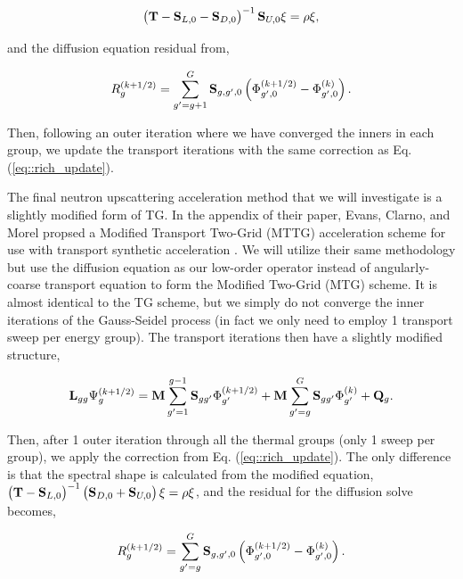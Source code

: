 \documentclass[11pt]{article}
\begin{document}
\begin{equation}
\label{eq::TG_accel_EC}
\left( {\bf T}- {\bf S}_{L,0} - {\bf S}_{D,0} \right)^{-1}  {\bf S}_{U,0}  \xi = \rho \xi,
\end{equation}

\noindent and the diffusion equation residual from,

\begin{equation}
\label{eq::TG_residual}
R_g^{(k+1/2)} =  \sum_{g'=g+1}^G {\bf S}_{g, g',0} \left(  \Phi_{g',0}^{(k+1/2)} - \Phi_{g',0}^{(k)}  \right).
\end{equation}

\noindent Then, following an outer iteration where we have converged the inners in each group, we update the transport iterations with the same correction as Eq. (\ref{eq::rich_update}).

The final neutron upscattering acceleration method that we will investigate is a slightly modified form of TG. In the appendix of their paper, Evans, Clarno, and Morel propsed a Modified Transport Two-Grid (MTTG) acceleration scheme for use with transport synthetic acceleration \cite{evans2010transport}. We will utilize their same methodology but use the diffusion equation as our low-order operator instead of angularly-coarse transport equation to form the Modified Two-Grid (MTG) scheme. It is almost identical to the TG scheme, but we simply do not converge the inner iterations of the Gauss-Seidel process (in fact we only need to employ 1 transport sweep per energy group). The transport iterations then have a slightly modified structure,

\begin{equation}
\label{eq::MTG_it}
{\bf L}_{gg} \Psi_g^{(k+1/2)} = {\bf M} \sum_{g'=1}^{g-1} {\bf S}_{g g'} \Phi_{g'}^{(k+1/2)} + {\bf M} \sum_{g'=g}^G {\bf S}_{g g'} \Phi_{g'}^{(k)} + {\bf Q}_g .
\end{equation}

Then, after 1 outer iteration through all the thermal groups (only 1 sweep per group), we apply the correction from Eq. (\ref{eq::rich_update}). The only difference is that the spectral shape is calculated from the modified equation, $\left( {\bf T}- {\bf S}_{L,0} \right)^{-1} \left( {\bf S}_{D,0}+ {\bf S}_{U,0} \right) \xi = \rho \xi $, and the residual for the diffusion solve becomes,

\begin{equation}
\label{eq::MTG_residual}
R_g^{(k+1/2)} =  \sum_{g'=g}^G {\bf S}_{g, g',0} \left(  \Phi_{g',0}^{(k+1/2)} - \Phi_{g',0}^{(k)}  \right).
\end{equation}
\end{document}
